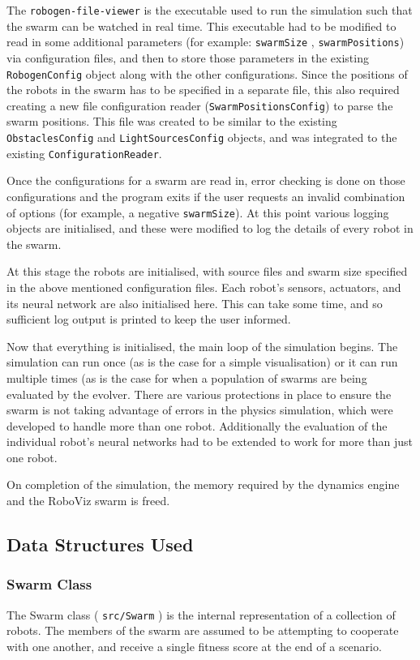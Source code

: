 \documentclass[11pt,a4paper]{article}
\begin{document}
The \texttt{robogen-file-viewer} is the executable used to run the simulation
such that the swarm can be watched in real time. This executable had to be
modified to read in some additional parameters (for example: \texttt{swarmSize}
, \texttt{swarmPositions}) via configuration files, and then to store those
parameters in the existing \texttt{RobogenConfig} object along with the other
configurations. Since the positions of the robots in the swarm has to be
specified in a separate file, this also required creating a new file
configuration reader (\texttt{SwarmPositionsConfig}) to parse the swarm
positions. This file was created to be similar to the existing
\texttt{ObstaclesConfig} and \texttt{LightSourcesConfig} objects, and was
integrated to the existing \texttt{ConfigurationReader}.

Once the configurations for a swarm are read in, error checking is done on
those configurations and the program exits if the user requests an invalid
combination of options (for example, a negative \texttt{swarmSize}).
At this point various logging objects are initialised, and these were modified
to log the details of every robot in the swarm.

At this stage the robots are initialised, with source files and swarm size
specified in the above mentioned configuration files. Each robot's sensors,
actuators, and its neural network are also initialised here. This can take some
time, and so sufficient log output is printed to keep the user informed.

Now that everything is initialised, the main loop of the simulation begins. The
simulation can run once (as is the case for a simple visualisation) or it can
run multiple times (as is the case for when a population of swarms are being
evaluated by the evolver. There are various protections in place to ensure the
swarm is not taking advantage of errors in the physics simulation, which were
developed to handle more than one robot. Additionally the evaluation of the
individual robot's neural networks had to be extended to work for more than
just one robot.

On completion of the simulation, the memory required by the dynamics engine
\cite{ODE} and the RoboViz swarm is freed.

\subsection{Data Structures Used}
\subsubsection{Swarm Class}
The Swarm class ( \texttt{src/Swarm} ) is the internal representation of a
collection of robots. The members of the swarm are assumed to be attempting to
cooperate with one another, and receive a single fitness score at the end of a
scenario.
\end{document}
